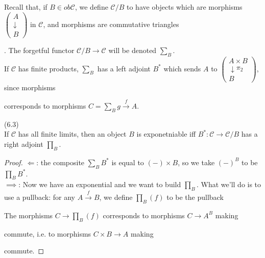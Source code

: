 \documentclass[a4paper]{article}
\begin{document}
Recall that, if $B \in ob\mathcal{C}$, we define $\mathcal{C}/B$ to have objects which are morphisms $\begin{pmatrix}A\\\downarrow\\B\end{pmatrix}$ in $\mathcal{C}$, and morphisms are commutative triangles 
. The forgetful functor $\mathcal{C}/B \to \mathcal{C}$ will be denoted $\sum_B$.\\
If $\mathcal{C}$ has finite products, $\sum_B$ has a left adjoint $B^*$ which sends $A$ to $\begin{pmatrix}A \times B\\\downarrow \pi_2\\B\end{pmatrix}$, since morphisms
corresponds to morphisms $C = \sum_B g \xrightarrow{f} A$.

\begin{lemma} (6.3)\\
    If $\mathcal{C}$ has all finite limits, then an object $B$ is exponetniable iff $B^*:\mathcal{C} \to \mathcal{C}/B$ has a right adjoint $\prod_B$.
    \begin{proof}
        $\Leftarrow$: the composite $\sum_B B^*$ is equal to $(-) \times B$, so we take $(-)^B$ to be $\prod_B B^*$.\\
        $\implies$: Now we have an exponential and we want to build $\prod_B$. What we'll do is to use a pullback: for any $A \xrightarrow{f} B$, we define $\prod_B(f)$ to be the pullback


        The morphisms $C \to \prod_B(f)$ corresponds to morphisms $C \to A^B$ making 
        commute, i.e. to morphisms $C \times B \to A$ making 
        commute.
    \end{proof}
\end{lemma}
\end{document}
